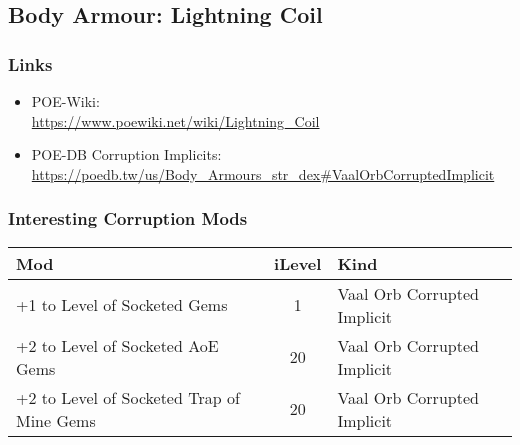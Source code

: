 \subsection{Body Armour: Lightning Coil}
\subsubsection{Links}
\begin{itemize}
	\item POE-Wiki:\\
	\url{https://www.poewiki.net/wiki/Lightning_Coil}
	\item POE-DB Corruption Implicits:
	\url{https://poedb.tw/us/Body_Armours_str_dex#VaalOrbCorruptedImplicit}
\end{itemize}

\subsubsection{Interesting Corruption Mods}
\begin{tabular}{|l|c|l|}
	\hline
	Mod&iLevel&Kind\\\hline
	+1 to Level of Socketed Gems&1& Vaal Orb Corrupted Implicit \\\hline
	+2 to Level of Socketed AoE Gems&20& Vaal Orb Corrupted Implicit \\\hline
	+2 to Level of Socketed Trap of Mine Gems&20& Vaal Orb Corrupted Implicit \\\hline
\end{tabular}

